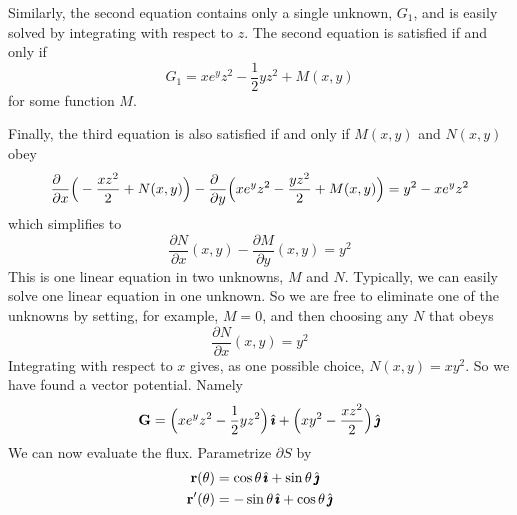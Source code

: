 \begin{solution}
Similarly, the second equation contains only a single unknown,
$G_1$, and is easily solved by integrating with respect to $z$. 
The second equation is satisfied if and only if
\begin{equation*}
G_1 = xe^y z^2 - \frac{1}{2}yz^2 + M(x,y)
\end{equation*}
for some function $M$. 

Finally, the third equation is also satisfied
if and only if $M(x,y)$ and $N(x,y)$ obey
\begin{equation*}
\frac{\partial\hfill}{\partial x}\Big(-\frac{xz^2}{2} + N(x,y)\Big) 
-\frac{\partial\hfill}{\partial y}\Big(xe^yz^2-\frac{yz^2}{2} + M(x,y)\Big)
     =y^2 - xe^y z^2
\end{equation*}
which simplifies to
\begin{equation*}
\frac{\partial N}{\partial x}(x,y) -\frac{\partial M}{\partial y}(x,y) =y^2
\end{equation*}
This is one linear equation in two unknowns, $M$ and $N$. 
Typically, we can easily solve one linear equation in one unknown. 
So we are free to eliminate one of the unknowns by setting, for example, 
$M=0$, and then choosing any $N$ that obeys
\begin{equation*}
\frac{\partial N}{\partial x}(x,y) = y^2
\end{equation*}
Integrating with respect to $x$ gives, as one possible choice, $N(x,y) = xy^2$. So we have found a vector potential. Namely
\begin{equation*}
\mathbf{G} = \Big( xe^y z^2 - \frac{1}{2}yz^2\Big)\,\hat{\pmb{\imath}} 
       +\Big(xy^2  -\frac{xz^2}{2}\Big)\,\hat{\pmb{\jmath}}
\end{equation*}
We can now evaluate the flux. Parametrize $\partial S$
by 
\begin{align*}
\mathbf{r}(\theta) & = \cos\theta\,\hat{\pmb{\imath}} +\sin\theta\,\hat{\pmb{\jmath}} \\
\mathbf{r}'(\theta) & = -\sin\theta\,\hat{\pmb{\imath}} +\cos\theta\,\hat{\pmb{\jmath}} 
\end{align*}

\end{solution}
